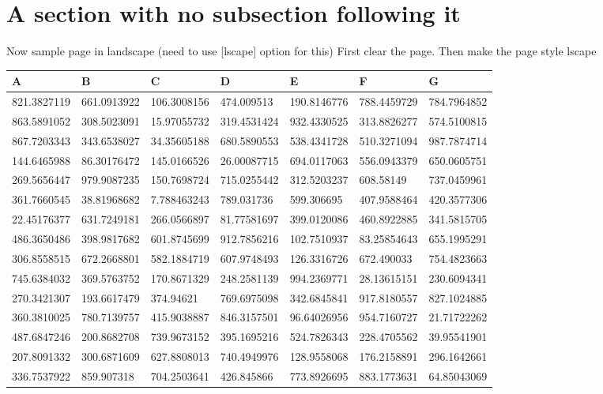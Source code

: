 \documentclass[lscape]{msu-thesis}
\begin{document}
\section{A section with no subsection following it}
\lipsum[9]
 Now sample page in landscape (need to use [lscape] option for this)
 First clear the page. Then make the page style {lscape}
\clearpage\pagestyle{lscape}
\begin{landscape}
\begin{table}
\centering
\begin{tabular}{lllllll}

\toprule
A & B & C & D & E & F & G \\
\midrule
821.3827119 & 661.0913922 & 106.3008156 & 474.009513 & 190.8146776 & 788.4459729 & 784.7964852 \\
863.5891052 & 308.5023091 & 15.97055732 & 319.4531424 & 932.4330525 & 313.8826277 & 574.5100815 \\
867.7203343 & 343.6538027 & 34.35605188 & 680.5890553 & 538.4341728 & 510.3271094 & 987.7874714 \\
144.6465988 & 86.30176472 & 145.0166526 & 26.00087715 & 694.0117063 & 556.0943379 & 650.0605751 \\
269.5656447 & 979.9087235 & 150.7698724 & 715.0255442 & 312.5203237 & 608.58149 & 737.0459961 \\
361.7660545 & 38.81968682 & 7.788463243 & 789.031736 & 599.306695 & 407.9588464 & 420.3577306 \\
22.45176377 & 631.7249181 & 266.0566897 & 81.77581697 & 399.0120086 & 460.8922885 & 341.5815705 \\
486.3650486 & 398.9817682 & 601.8745699 & 912.7856216 & 102.7510937 & 83.25854643 & 655.1995291 \\
306.8558515 & 672.2668801 & 582.1884719 & 607.9748493 & 126.3316726 & 672.490033 & 754.4823663 \\
745.6384032 & 369.5763752 & 170.8671329 & 248.2581139 & 994.2369771 & 28.13615151 & 230.6094341 \\
270.3421307 & 193.6617479 & 374.94621 & 769.6975098 & 342.6845841 & 917.8180557 & 827.1024885 \\
360.3810025 & 780.7139757 & 415.9038887 & 846.3157501 & 96.64026956 & 954.7160727 & 21.71722262 \\
487.6847246 & 200.8682708 & 739.9673152 & 395.1695216 & 524.7826343 & 228.4705562 & 39.95541901 \\
207.8091332 & 300.6871609 & 627.8808013 & 740.4949976 & 128.9558068 & 176.2158891 & 296.1642661 \\
336.7537922 & 859.907318 & 704.2503641 & 426.845866 & 773.8926695 & 883.1773631 & 64.85043069 \\


\end{tabular}
\end{table}
\end{landscape}
\end{document}
